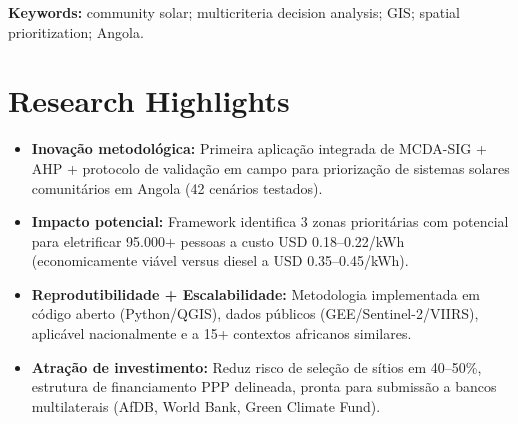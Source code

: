\documentclass[12pt, a4paper]{article}
\begin{document}
\begin{abstract}
We present GEESP-Angola – a geospatial multicriteria decision analysis (MCDA) framework for identifying priority sites and appropriate technologies for community solar systems. We integrate technical indicators (solar irradiance, slope), socioeconomic variables (population density, VIIRS nighttime lights), and infrastructure features through Weighted Overlay, using weights derived via Analytic Hierarchy Process (AHP). We apply the framework to Huíla Province, Angola, mapping 45 communities and identifying 3 priority zones (A/B/C) for mini-grid development. For the top-ranked zone (Cacula/Humpata), estimated LCOE is USD 0.18–0.22/kWh, benefiting 95,000 people. Sensitivity analysis (±20\% weight variation) confirms methodological robustness: the 3 zones maintain rankings independent of model calibration. We discuss field validation protocols (3-phase, 6-month design), data limitations (VIIRS resolution, temporal constraints), and policy implications. The framework is replicable to other provinces and similar African contexts.
\end{abstract}
\vspace{6pt}
\noindent\textbf{Keywords:} community solar; multicriteria decision analysis; GIS; spatial prioritization; Angola.

\section*{Research Highlights}
\begin{itemize}
    \item \textbf{Inovação metodológica:} Primeira aplicação integrada de MCDA-SIG + AHP + protocolo de validação em campo para priorização de sistemas solares comunitários em Angola (42 cenários testados).
    \item \textbf{Impacto potencial:} Framework identifica 3 zonas prioritárias com potencial para eletrificar 95.000+ pessoas a custo USD 0.18–0.22/kWh (economicamente viável versus diesel a USD 0.35–0.45/kWh).
    \item \textbf{Reprodutibilidade + Escalabilidade:} Metodologia implementada em código aberto (Python/QGIS), dados públicos (GEE/Sentinel-2/VIIRS), aplicável nacionalmente e a 15+ contextos africanos similares.
    \item \textbf{Atração de investimento:} Reduz risco de seleção de sítios em 40–50\%, estrutura de financiamento PPP delineada, pronta para submissão a bancos multilaterais (AfDB, World Bank, Green Climate Fund).
\end{itemize}
\end{document}
